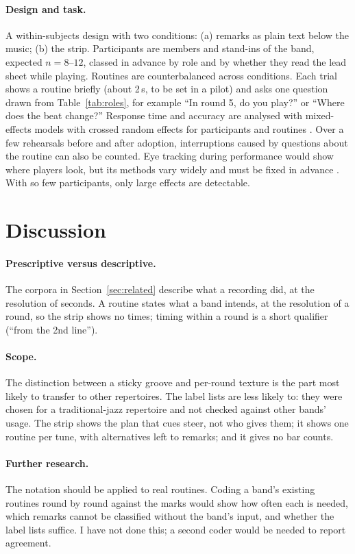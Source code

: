 \documentclass[10pt,twocolumn,a4paper]{article}
\begin{document}
\paragraph{Design and task.} A within-subjects design with two conditions: (a) remarks
as plain text below the music; (b) the strip. Participants are members and stand-ins
of the band, expected $n = 8$--$12$, classed in advance by role and by whether they
read the lead sheet while playing. Routines are counterbalanced across conditions.
Each trial shows a routine briefly (about 2\,s, to be set in a pilot) and asks one
question drawn from Table~\ref{tab:roles}, for example ``In round 5, do you play?'' or
``Where does the beat change?'' Response time and accuracy are analysed with mixed-effects
models with crossed random effects for participants and routines \citep{baayen2008}.
Over a few rehearsals before and after adoption, interruptions caused by questions
about the routine can also be counted. Eye tracking during performance would show where
players look, but its methods vary widely and must be fixed in advance
\citep{puurtinen2018}. With so few participants, only large effects are detectable.

\section{Discussion}

\paragraph{Prescriptive versus descriptive.} The corpora in Section~\ref{sec:related}
describe what a recording did, at the resolution of seconds. A routine states what a
band intends, at the resolution of a round, so the strip shows no times; timing within
a round is a short qualifier (``from the 2nd line'').

\paragraph{Scope.} The distinction between a sticky groove and per-round texture
is the part most likely to transfer to other repertoires. The label lists are
less likely to: they were chosen for a traditional-jazz repertoire and not checked
against other bands' usage. The strip shows the plan that cues steer, not who gives
them; it shows one routine per tune, with alternatives left to remarks; and it gives
no bar counts.

\paragraph{Further research.} The notation should be applied to real routines. Coding
a band's existing routines round by round against the marks would show how often each
is needed, which remarks cannot be classified without the band's input, and whether
the label lists suffice. I have not done this; a second coder would be needed to report
agreement.
\end{document}
